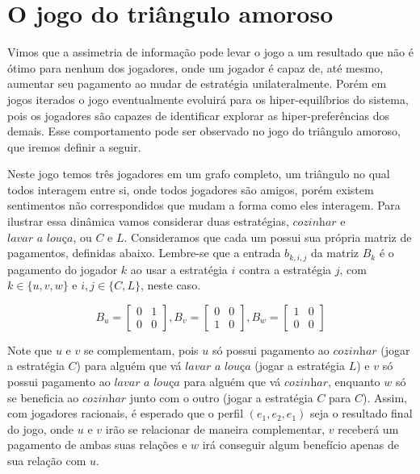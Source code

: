 \chapter{O jogo do triângulo amoroso}

Vimos que a assimetria de informação pode levar o jogo a um resultado que não é ótimo para nenhum dos jogadores, onde um jogador é capaz de, até mesmo, aumentar seu pagamento ao mudar de estratégia unilateralmente. Porém em jogos iterados o jogo eventualmente evoluirá para os hiper-equilíbrios do sistema, pois os jogadores são capazes de identificar explorar as hiper-preferências dos demais. Esse comportamento pode ser observado no jogo do triângulo amoroso, que iremos definir a seguir.

Neste jogo temos três jogadores em um grafo completo, um triângulo no qual todos interagem entre si, onde todos jogadores são amigos, porém existem sentimentos não correspondidos que mudam a forma como eles interagem. Para ilustrar essa dinâmica vamos considerar duas estratégias, $\textit{cozinhar}$ e $\textit{lavar a louça}$, ou $C$ e $L$. Consideramos que cada um possui sua própria matriz de pagamentos, definidas abaixo. Lembre-se que a entrada $b_{k,i,j}$ da matriz $B_k$ é o pagamento do jogador $k$ ao usar a estratégia $i$ contra a estratégia $j$, com $k\in\{u,v,w\}$ e $i,j\in\{C,L\}$, neste caso.

\begin{equation}
    \label{payoffLoveTri}
    B_u=
    \begin{bmatrix}
        0 & 1\\ 
        0 & 0 
    \end{bmatrix},
    B_v=
    \begin{bmatrix}
        0 & 0\\ 
        1 & 0 
    \end{bmatrix},
    B_w=
    \begin{bmatrix}
        1 & 0\\ 
        0 & 0 
    \end{bmatrix}
\end{equation}

Note que $u$ e $v$ se complementam, pois $u$ só possui pagamento ao $\textit{cozinhar}$ (jogar a estratégia $C$) para alguém que vá $\textit{lavar a louça}$ (jogar a estratégia $L$) e $v$ só possui pagamento ao $\textit{lavar a louça}$ para alguém que vá $\textit{cozinhar}$, enquanto $w$ só se beneficia ao $\textit{cozinhar}$ junto com o outro (jogar a estratégia $C$ para $C$). Assim, com jogadores racionais, é esperado que o perfil $(e_1,e_2,e_1)$ seja o resultado final do jogo, onde $u$ e $v$ irão se relacionar de maneira complementar, $v$ receberá um pagamento de ambas suas relações e $w$ irá conseguir algum benefício apenas de sua relação com $u$.

